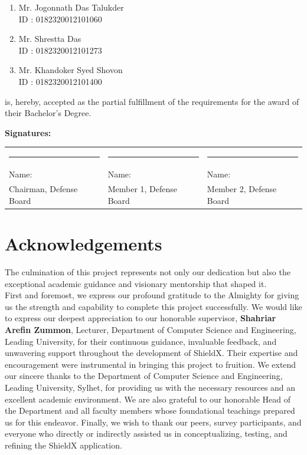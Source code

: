 \documentclass[12pt, a4paper, twoside]{report}
\begin{document}
\begin{enumerate}[label=\arabic*.]
    \item Mr. Jogonnath Das Talukder\\
          ID : 0182320012101060
    \item Mr. Shrestta Das\\
          ID : 0182320012101273
    \item Mr. Khandoker Syed Shovon\\
          ID : 0182320012101400
\end{enumerate}

is, hereby, accepted as the partial fulfillment of the requirements for the award of their Bachelor's Degree.
\vspace{3cm}

\noindent\textbf{Signatures:}\\[2cm]
\noindent
\begin{tabularx}{\textwidth}{@{}XXX@{}}
    \rule{4.5cm}{0.4pt} & \rule{4.5cm}{0.4pt} & \rule{4.5cm}{0.4pt} \\
    Name: & Name: & Name: \\[0.5cm]
    Chairman, Defense Board & Member 1, Defense Board & Member 2, Defense Board
\end{tabularx}
\clearpage
\chapter*{Acknowledgements}
The culmination of this project represents not only our dedication but also the exceptional academic guidance and visionary mentorship that shaped it.\\[0.5cm]
First and foremost, we express our profound gratitude to the Almighty for giving us the strength and capability to complete this project successfully.
We would like to express our deepest appreciation to our honorable supervisor, \textbf{Shahriar Arefin Zummon}, Lecturer, Department of Computer Science and Engineering, Leading University, for their continuous guidance, invaluable feedback, and unwavering support throughout the development of ShieldX. Their expertise and encouragement were instrumental in bringing this project to fruition.
We extend our sincere thanks to the Department of Computer Science and Engineering, Leading University, Sylhet, for providing us with the necessary resources and an excellent academic environment. We are also grateful to our honorable Head of the Department and all faculty members whose foundational teachings prepared us for this endeavor.
Finally, we wish to thank our peers, survey participants, and everyone who directly or indirectly assisted us in conceptualizing, testing, and refining the ShieldX application.
\end{document}
